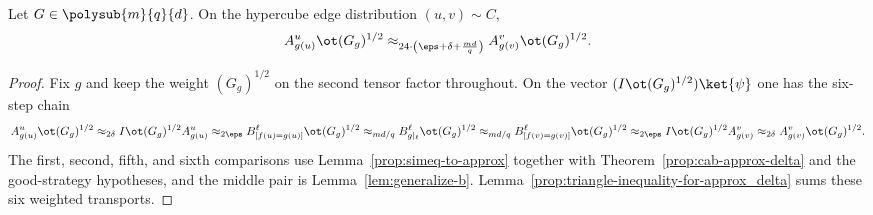 \begin{lemma}\label{lem:local-variance-of-points}
	\leanok
	Let $G \in \polysub{m}{q}{d}$. On the hypercube edge distribution $(u,v) \sim C$,
	\begin{equation}
		A^u_{g(u)} \ot (G_g)^{1/2}
		\approx_{24\cdot\left(\eps+\delta+\frac{md}{q}\right)}
		A^v_{g(v)} \ot (G_g)^{1/2}.
		\label{eq:local-variance-of-points-equation}
	\end{equation}
\end{lemma}
\begin{proof}
	\leanok
	Fix $g$ and keep the weight $(G_g)^{1/2}$ on the second tensor factor throughout. On the vector $(I\ot (G_g)^{1/2})\ket{\psi}$ one has the six-step chain
	\[
		A^u_{g(u)} \ot (G_g)^{1/2}
		\approx_{2\delta} I\ot (G_g)^{1/2} A^u_{g(u)}
		\approx_{2\eps} B^\ell_{[f(u)=g(u)]} \ot (G_g)^{1/2}
		\approx_{md/q} B^\ell_{g|_\ell} \ot (G_g)^{1/2}
		\approx_{md/q} B^\ell_{[f(v)=g(v)]} \ot (G_g)^{1/2}
		\approx_{2\eps} I\ot (G_g)^{1/2} A^v_{g(v)}
		\approx_{2\delta} A^v_{g(v)} \ot (G_g)^{1/2}.
	\]
	The first, second, fifth, and sixth comparisons use Lemma~\ref{prop:simeq-to-approx} together with Theorem~\ref{prop:cab-approx-delta} and the good-strategy hypotheses, and the middle pair is Lemma~\ref{lem:generalize-b}. Lemma~\ref{prop:triangle-inequality-for-approx_delta} sums these six weighted transports.
\end{proof}

